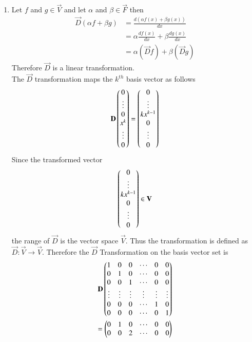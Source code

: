 \documentclass[journal,12pt,twocolumn]{IEEEtran}
\begin{document}
\begin{enumerate}[label=\emph{\alph*)}]
\item
Let $f$ and $g \in \vec{V}$ and let $\alpha$ and $\beta \in \vec{F}$ then 
		\begin{align}
			\vec{D}(\alpha f + \beta g)&=\frac{d(\alpha f(x) + \beta g(x))}{dx} \\
			&=\alpha\frac{df(x)}{dx}+\beta\frac{dg(x)}{dx}\\
			&=\alpha(\vec{D}f)+\beta(\vec{D}g)
		\end{align}
Therefore $\vec{D}$ is a linear transformation.\\
The $\vec{D}$ transformation maps the $k^{th}$ basis vector as follows
		\begin{align}
			\mathbf{D}\begin{pmatrix}0\\\vdots\\0\\x^k\\\vdots\\0\end{pmatrix}
			=\begin{pmatrix}0\\\vdots\\kx^{k-1}\\0\\\vdots\\0\end{pmatrix}
		\end{align}
Since the transformed vector 
		\begin{align}
			\begin{pmatrix}0\\\vdots\\kx^{k-1}\\0\\\vdots\\0\end{pmatrix} \in \mathbf{V}
		\end{align}
the range of $\vec{D}$ is the vector space $\vec{V}$. Thus the transformation is defined as
$\vec{D}:\vec{V} \rightarrow \vec{V}$.
Therefore the $\vec{D}$ Transformation on the basis vector set is
		\begin{align}
			\mathbf{D}\begin{pmatrix}1 & 0 & 0 & \cdots & 0 & 0\\
				      0 & 1 & 0 & \cdots & 0 & 0 \\
				      0 & 0 & 1 & \cdots & 0 & 0 \\
				      \vdots & \vdots & \vdots & \vdots & \vdots & \vdots\\
				      0 & 0 & 0 & \cdots & 1 & 0 \\
				      0 & 0 & 0 & \cdots & 0 & 1\end{pmatrix}\\
			      =\begin{pmatrix}0 & 1 & 0 & \cdots & 0 & 0\\
				      0 & 0 & 2 & \cdots & 0 & 0\\
\end{pmatrix}
\end{align}
\end{enumerate}
\end{document}
